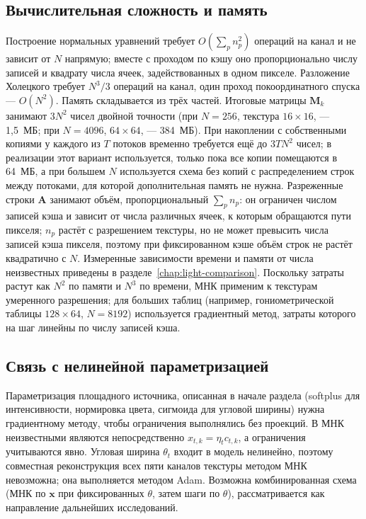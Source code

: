\subsection{Вычислительная сложность и память}

Построение нормальных уравнений требует $O\!\left(\sum_p n_p^2\right)$ операций на канал и не зависит от $N$ напрямую; вместе с проходом по кэшу оно пропорционально числу записей и квадрату числа ячеек, задействованных в одном пикселе. Разложение Холецкого требует $N^3/3$ операций на канал, один проход покоординатного спуска --- $O(N^2)$. Память складывается из трёх частей. Итоговые матрицы $\mathbf{M}_k$ занимают $3N^2$ чисел двойной точности (при $N=256$, текстура $16\times16$, --- 1,5~МБ; при $N=4096$, $64\times64$, --- 384~МБ). При накоплении с собственными копиями у каждого из $T$ потоков временно требуется ещё до $3TN^2$ чисел; в реализации этот вариант используется, только пока все копии помещаются в 64~МБ, а при большем $N$ используется схема без копий с распределением строк между потоками, для которой дополнительная память не нужна. Разреженные строки $\mathbf{A}$ занимают объём, пропорциональный $\sum_p n_p$: он ограничен числом записей кэша и зависит от числа различных ячеек, к которым обращаются пути пикселя; $n_p$ растёт с разрешением текстуры, но не может превысить числа записей кэша пикселя, поэтому при фиксированном кэше объём строк не растёт квадратично с $N$. Измеренные зависимости времени и памяти от числа неизвестных приведены в разделе~\ref{chap:light-comparison}. Поскольку затраты растут как $N^2$ по памяти и $N^3$ по времени, МНК применим к текстурам умеренного разрешения; для больших таблиц (например, гониометрической таблицы $128\times64$, $N=8192$) используется градиентный метод, затраты которого на шаг линейны по числу записей кэша.

\subsection{Связь с нелинейной параметризацией}

Параметризация площадного источника, описанная в начале раздела (softplus для интенсивности, нормировка цвета, сигмоида для угловой ширины) нужна градиентному методу, чтобы ограничения выполнялись без проекций. В МНК неизвестными являются непосредственно $x_{t,k}=\eta_tc_{t,k}$, а ограничения учитываются явно. Угловая ширина $\theta_t$ входит в модель нелинейно, поэтому совместная реконструкция всех пяти каналов текстуры методом МНК невозможна; она выполняется методом Adam. Возможна комбинированная схема (МНК по $\mathbf{x}$ при фиксированных $\theta$, затем шаги по $\theta$), рассматривается как направление дальнейших исследований.


